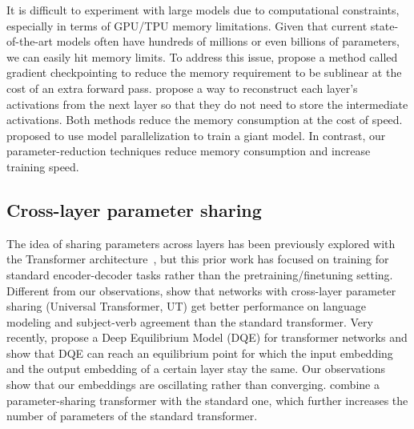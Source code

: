It is difficult to experiment with large models due to computational constraints, especially in terms of 
GPU/TPU memory limitations.
Given that current state-of-the-art models often have hundreds of millions or even billions of parameters, we can easily hit  memory limits.
To address this issue, \cite{chen2016training} propose a method called gradient checkpointing to reduce the memory requirement to be sublinear at the cost of an extra forward pass. 
\cite{gomez2017reversible} propose a way to reconstruct each layer's activations from the next layer so that they do not need to store the intermediate activations.
Both methods reduce the memory consumption at the cost of speed. \cite{raffel2019exploring} proposed to use model parallelization to train a giant model.
In contrast, our parameter-reduction techniques reduce memory consumption and increase training speed. 


\subsection{Cross-layer parameter sharing}
The idea of sharing parameters across layers 
has been previously explored with the Transformer architecture~\citep{vaswani2017attention}, but this prior work has focused on training for standard encoder-decoder tasks rather than the pretraining/finetuning setting. Different from our observations, \cite{dehghani2018universal} show that  networks with cross-layer parameter sharing (Universal Transformer, UT) get better performance on language modeling and subject-verb agreement than the standard transformer. Very recently, \cite{bai2019deep} propose a Deep Equilibrium Model (DQE) for transformer networks and show that DQE can reach an equilibrium point for which the input embedding and the output embedding of a certain layer stay the same. Our observations show that our embeddings are oscillating rather than converging. \cite{Hao_2019} combine a parameter-sharing transformer with the standard one, which further increases the number of parameters of the standard transformer.  

\vspace{-5pt}
